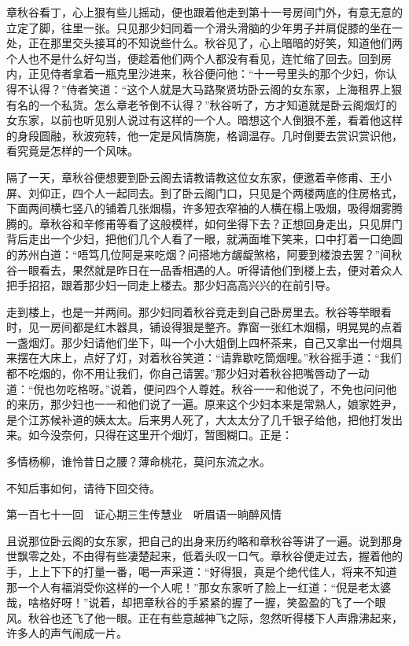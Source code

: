 \documentclass[12pt,UTF8]{ctexbook}
\begin{document}
{{{章秋谷看丁，心上狠有些儿摇动，便也跟着他走到第十一号房间门外，有意无意的立定了脚，往里一张。只见那少妇同着一个滑头滑脑的少年男子并肩促膝的坐在一处，正在那里交头接耳的不知说些什么。秋谷见了，心上暗暗的好笑，知道他们两个人也不是什么好勾当，便趁着他们两个人都没有看见，连忙缩了回去。回到房内，正见侍者拿着一瓶克里沙进来，秋谷便问他：“十一号里头的那个少妇，你认得不认得？”侍者笑道：“这个人就是大马路聚贤坊卧云阁的女东家，上海租界上狠有名的一个私货。怎么章老爷倒不认得？”秋谷听了，方才知道就是卧云阁烟灯的女东家，以前也听见别人说过有这样的一个人。暗想这个人倒狠不差，看着他这样的身段圆融，秋波宛转，他一定是风情旖旎，格调温存。几时倒要去赏识赏识他，看究竟是怎样的一个风味。

隔了一天，章秋谷便想要到卧云阁去请教请教这位女东家，便邀着辛修甫、王小屏、刘仰正，四个人一起同去。到了卧云阁门口，只见是个两楼两底的住房格式，下面两间横七竖八的铺着几张烟榻，许多短衣窄袖的人横在榻上吸烟，吸得烟雾腾腾的。章秋谷和辛修甫等看了这般模样，如何坐得下去？正想回身走出，只见屏门背后走出一个少妇，把他们几个人看了一眼，就满面堆下笑来，口中打着一口绝圆的苏州白道：“唔笃几位阿是来吃烟？问搭地方龌龊煞格，阿要到楼浪去罢？”间秋谷一眼看去，果然就是昨日在一品香相遇的人。听得请他们到楼上去，便对着众人把手招招，跟着那少妇一同走上楼去。那少妇高高兴兴的在前引导。

走到楼上，也是一并两间。那少妇同着秋谷竞走到自己卧房里去。秋谷等举眼看时，见一房间都是红木器具，铺设得狠是整齐。靠窗一张红木烟榻，明晃晃的点着一盏烟灯。那少妇请他们坐下，叫一个小大姐倒上四杯茶来，自己又拿出一付烟具来摆在大床上，点好了灯，对着秋谷笑道：“请靠歇吃筒烟哩。”秋谷摇手道：“我们都不吃烟的，你不用让我们，你自己请罢。”那少妇对着秋谷把嘴唇动了一动道：“倪也勿吃格呀。”说着，便问四个人尊姓。秋谷一一和他说了，不免也问问他的来历，那少妇也一一和他们说了一遍。原来这个少妇本来是常熟人，娘家姓尹，是个江苏候补道的姨太太。后来男人死了，大太太分了几千银子给他，把他打发出来。如今没奈何，只得在这里开个烟灯，暂图糊口。正是：

多情杨柳，谁怜昔日之腰？薄命桃花，莫问东流之水。

不知后事如何，请待下回交待。





第一百七十一回　证心期三生传慧业　听眉语一晌醉风情





且说那位卧云阁的女东家，把自己的出身来历约略和章秋谷等讲了一遍。说到那身世飘零之处，不由得有些凄楚起来，低着头叹一口气。章秋谷便走过去，握着他的手，上上下下的打量一番，喝一声采道：“好得狠，真是个绝代佳人，将来不知道那一个人有福消受你这样的一个人呢！”那女东家听了脸上一红道：“倪是老太婆哉，啥格好呀！”说着，却把章秋谷的手紧紧的握了一握，笑盈盈的飞了一个眼风。秋谷也还飞了他一眼。正在有些意越神飞之际，忽然听得楼下人声鼎沸起来，许多人的声气闹成一片。

}}}
\end{document}
